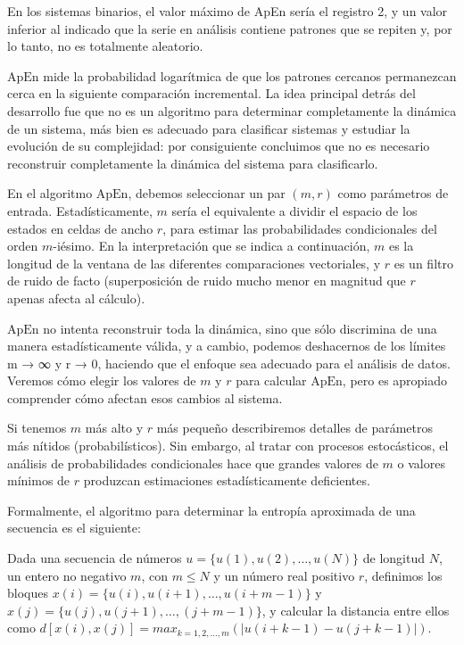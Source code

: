 \documentclass[a4paper,12pt]{article}
\begin{document}
En los sistemas binarios, el valor máximo de ApEn sería el registro 2, y un valor inferior al indicado que la serie en análisis contiene patrones que se repiten y, por lo tanto, no es totalmente aleatorio.

$\textrm{ApEn}$ mide la probabilidad logarítmica de que los patrones cercanos permanezcan cerca en la siguiente comparación incremental. La idea principal detrás del desarrollo fue que no es un algoritmo para determinar completamente la dinámica de un sistema, más bien es adecuado para clasificar sistemas y estudiar la evolución de su complejidad: por consiguiente concluimos que no es necesario reconstruir completamente la dinámica del sistema para clasificarlo.

En el algoritmo $\textrm{ApEn}$, debemos seleccionar un par $(m, r)$ como parámetros de entrada. Estadísticamente, $m$ sería el equivalente a dividir el espacio de los estados en celdas de ancho $r$, para estimar las probabilidades condicionales del orden $m$-iésimo. En la interpretación que se indica a continuación, $m$ es la longitud de la ventana de las diferentes comparaciones vectoriales, y $r$ es un filtro de ruido de facto (superposición de ruido mucho menor en magnitud que $r$ apenas afecta al cálculo).

$\textrm{ApEn}$ no intenta reconstruir toda la dinámica, sino que sólo discrimina de una manera estadísticamente válida, y a cambio, podemos deshacernos de los límites m → ∞ y r → 0, haciendo que el enfoque sea adecuado para el análisis de datos. Veremos cómo elegir los valores de $m$  y $r$ para calcular $\textrm{ApEn}$, pero es apropiado comprender cómo afectan esos cambios al sistema. 

Si tenemos $m$ más alto y $r$ más pequeño describiremos detalles de parámetros más nítidos (probabilísticos). Sin embargo, al tratar con procesos estocásticos, el análisis de probabilidades condicionales hace que grandes valores de $m$ o valores mínimos de $r$ produzcan estimaciones estadísticamente deficientes.

\clearpage

Formalmente, el algoritmo para determinar la entropía aproximada de una secuencia es el siguiente:

Dada una secuencia de números $u = \{u(1), u(2), \dots, u( N)\}$ de longitud $N$, un entero no negativo $m$, con $m \leq N$ y un número real positivo $r$, definimos los bloques $x(i) = \{u(i), u(i + 1), \dots, u(i + m - 1)\}$ y $x(j) = \{u(j), u(j+1), \dots, (j + m - 1)\}$, y calcular la distancia entre ellos como $d[x(i), x(j)] = max_{k=1,2, \dots,m}(|u(i + k - 1) - u( j + k - 1)|)$. 
\end{document}

